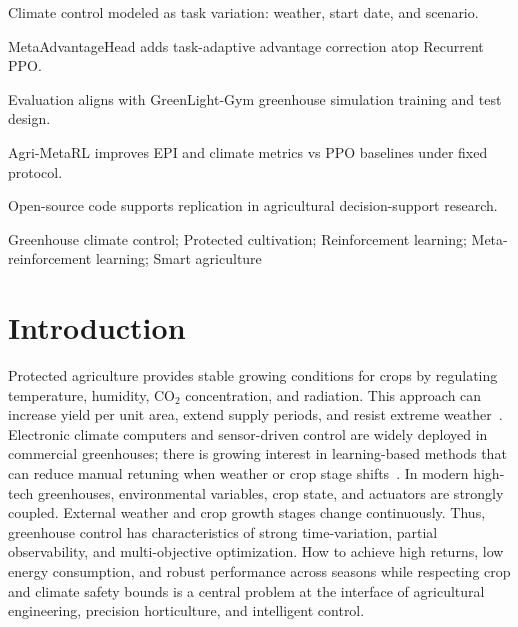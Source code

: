 \documentclass[number,preprint,review,12pt]{elsarticle}
\begin{document}
\begin{frontmatter}
\begin{highlights}
\item Climate control modeled as task variation: weather, start date, and scenario.
\item MetaAdvantageHead adds task-adaptive advantage correction atop Recurrent PPO.
\item Evaluation aligns with GreenLight-Gym greenhouse simulation training and test design.
\item Agri-MetaRL improves EPI and climate metrics vs PPO baselines under fixed protocol.
\item Open-source code supports replication in agricultural decision-support research.
\end{highlights}


\begin{keyword}
Greenhouse climate control; Protected cultivation; Reinforcement learning; Meta-reinforcement learning; Smart agriculture
\end{keyword}

\end{frontmatter}

\linenumbers

\section{Introduction}
Protected agriculture provides stable growing conditions for crops by regulating temperature, humidity, CO$_2$ concentration, and radiation. This approach can increase yield per unit area, extend supply periods, and resist extreme weather~\cite{vanhenten2006greenhouse,li2023smart}. Electronic climate computers and sensor-driven control are widely deployed in commercial greenhouses; there is growing interest in learning-based methods that can reduce manual retuning when weather or crop stage shifts~\cite{morcego2023reinforcement,van2025greenlight}. In modern high-tech greenhouses, environmental variables, crop state, and actuators are strongly coupled. External weather and crop growth stages change continuously. Thus, greenhouse control has characteristics of strong time-variation, partial observability, and multi-objective optimization. How to achieve high returns, low energy consumption, and robust performance across seasons while respecting crop and climate safety bounds is a central problem at the interface of agricultural engineering, precision horticulture, and intelligent control.
\end{document}
